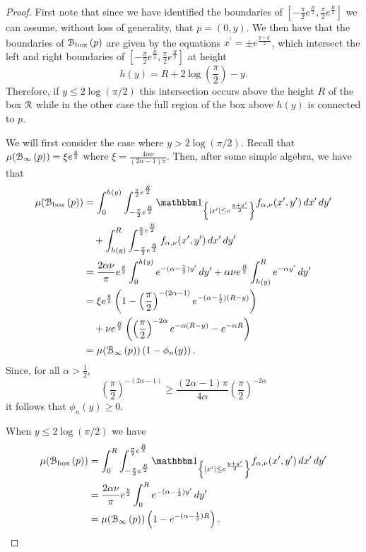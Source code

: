 \begin{proof}
First note that since we have identified the boundaries of $[-\frac{\pi}{2}e^{\frac{R}{2}}, \frac{\pi}{2}e^{\frac{R}{2}}]$ we can assume, without loss of generality, that $p = (0,y)$. We then have that the boundaries of ${\mathcal B}_{\text{box}}\left(p\right)$ are given by the equations $x^\prime = \pm e^{\frac{y+y^\prime}{2}}$, which intersect the left and right boundaries of $[-\frac{\pi}{2}e^{\frac{R}{2}}, \frac{\pi}{2}e^{\frac{R}{2}}]$ at height
\[
	h(y) = R + 2 \log\left(\frac{\pi}{2}\right) - y.
\]
Therefore, if $y \le 2 \log(\pi/2)$ this intersection occurs above the height $R$ of the box ${\mathcal R}$ while in the other case the full region of the box above $h(y)$ is connected to $p$. 

We will first consider the case where $y > 2 \log(\pi/2)$. Recall that $\mu({\mathcal B}_{\infty}\left(p\right)) = \xi e^{\frac{y}{2}}$ where $\xi = \frac{4\alpha \nu}{(2\alpha - 1)\pi}$. Then, after some simple algebra, we have that
\begin{align*}
	\mu(\BallPon{p})
	&= \int_0^{h(y)} \int_{-\frac{\pi}{2}e^{\frac{R}{2}}}^{\frac{\pi}{2}e^{\frac{R}{2}}} 
		\ind{|x^\prime| \le e^{\frac{y+y^\prime}{2}}} f_{\alpha,\nu}(x^\prime,y^\prime) \, dx^\prime \, dy^\prime\\
	&\hspace{10pt}+ \int_{h(y)}^{R} \int_{-\frac{\pi}{2}e^{\frac{R}{2}}}^{\frac{\pi}{2}e^{\frac{R}{2}}} 
		f_{\alpha,\nu}(x^\prime,y^\prime) \, dx^\prime \, dy^\prime\\
	&= \frac{2 \alpha \nu}{\pi} e^{\frac{y}{2}} \int_0^{h(y)} e^{-(\alpha - \frac{1}{2})y^\prime} \, dy^\prime
		+ \alpha \nu e^{\frac{R}{2}} \int_{h(y)}^{R} e^{-\alpha y^\prime} \, dy^\prime \\
	&= \xi e^{\frac{y}{2}}\left(1 - \left(\frac{\pi}{2}\right)^{-(2\alpha - 1)} 
		e^{-(\alpha - \frac{1}{2})(R - y)}\right)\\
	&\hspace{10pt}+ \nu e^{\frac{R}{2}}\left(\left(\frac{\pi}{2}\right)^{-2\alpha} e^{-\alpha(R - y)} 
		- e^{-\alpha R}\right)\\
	&= \mu(\BallPo{p})\left(1 - \phi_n(y)\right).
\end{align*}
Since, for all $\alpha > \frac{1}{2}$,
\[
	\left(\frac{\pi}{2}\right)^{-(2\alpha - 1)} \ge \frac{(2\alpha - 1)\pi}{4\alpha} \left(\frac{\pi}{2}\right)^{-2\alpha}
\]
it follows that $\phi_n(y) \ge 0$.

When $y \le 2 \log(\pi/2)$ we have
\begin{align*}
	\mu(\BallPon{p})
	&= \int_0^{R} \int_{-\frac{\pi}{2}e^{\frac{R}{2}}}^{\frac{\pi}{2}e^{\frac{R}{2}}} 
		\ind{|x^\prime| \le e^{\frac{y+y^\prime}{2}}} f_{\alpha,\nu}(x^\prime,y^\prime) \, dx^\prime \, dy^\prime\\
	&= \frac{2 \alpha \nu}{\pi} e^{\frac{y}{2}} \int_0^{R} e^{-(\alpha - \frac{1}{2})y^\prime} \, dy^\prime\\
	&= \mu(\BallPo{p})\left(1 - e^{-(\alpha - \frac{1}{2})R}\right).
\end{align*}
\end{proof}


